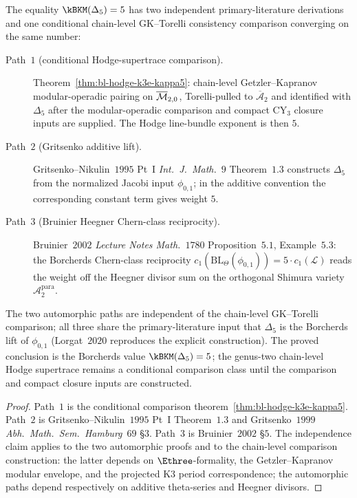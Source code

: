 \begin{proposition}[Two automorphic proofs and one conditional bridge for $\kBKM(\Delta_5) = 5$]
\label{prop:bl-three-path-triangulation-k3e}
The equality $\kBKM(\Delta_5) = 5$ has two independent
primary-literature derivations and one conditional chain-level
GK--Torelli consistency comparison converging on the same number:
\begin{description}
 \item[Path~$1$ (conditional Hodge-supertrace comparison).] Theorem~\ref{thm:bl-hodge-k3e-kappa5}: chain-level Getzler--Kapranov modular-operadic pairing on $\overline{\mathcal M}_{2, 0}$, Torelli-pulled to $\overline{\mathcal A}_2$ and identified with $\Delta_5$ after the modular-operadic comparison and compact CY$_3$ closure inputs are supplied. The Hodge line-bundle exponent is then $5$.
 \item[Path~$2$ (Gritsenko additive lift).] Gritsenko--Nikulin~$1995$ Pt~I \emph{Int.\ J.\ Math.}~$9$ Theorem~$1.3$ constructs $\Delta_5$ from the normalized Jacobi input $\phi_{0, 1}$; in the additive convention the corresponding constant term gives weight \(5\).
 \item[Path~$3$ (Bruinier Heegner Chern-class reciprocity).] Bruinier~$2002$ \emph{Lecture Notes Math.}~$1780$ Proposition~$5.1$, Example~$5.3$: the Borcherds Chern-class reciprocity $c_1(\mathrm{BL}_\Theta(\phi_{0, 1})) = 5 \cdot c_1(\mathcal L)$ reads the weight off the Heegner divisor sum on the orthogonal Shimura variety $\mathcal A_2^{\mathrm{para}}$.
\end{description}
The two automorphic paths are independent of the chain-level GK--Torelli
comparison; all three share the primary-literature input that $\Delta_5$
is the Borcherds lift of $\phi_{0, 1}$ (Lorgat~$2020$ reproduces the
explicit construction). The proved conclusion is the Borcherds
value $\kBKM(\Delta_5) = 5$; the genus-two chain-level Hodge
supertrace remains a conditional comparison class until the comparison
and compact closure inputs are constructed.
\end{proposition}

\begin{proof}
Path~$1$ is the conditional comparison theorem~\ref{thm:bl-hodge-k3e-kappa5}. Path~$2$ is
Gritsenko--Nikulin~$1995$ Pt~I Theorem~$1.3$ and Gritsenko~$1999$
\emph{Abh.\ Math.\ Sem.\ Hamburg}~$69$ \S$3$. Path~$3$ is
Bruinier~$2002$ \S$5$. The independence claim applies to the two
automorphic proofs and to the chain-level comparison construction: the
latter depends on $\Ethree$-formality, the Getzler--Kapranov modular
envelope, and the projected K3 period correspondence; the automorphic paths
depend respectively on additive theta-series and Heegner divisors.
\end{proof}

